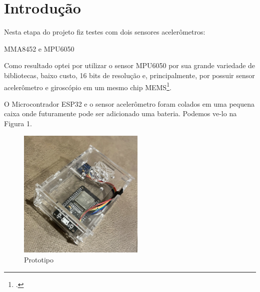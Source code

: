 \section{Introdução}


Nesta etapa do projeto fiz testes com dois sensores acelerômetros:

MMA8452 e MPU6050

Como resultado optei por utilizar o sensor MPU6050 por sua grande variedade de bibliotecas,
baixo custo, 16 bits de resolução e, principalmente, por possuir sensor acelerômetro e giroscópio em um mesmo chip MEMS\footcite{MEMS: Micro Eletro Mechanical System.}.

O Microcontrador ESP32 e o sensor acelerômetro foram colados em uma pequena caixa onde futuramente pode ser adicionado uma bateria. Podemos ve-lo na Figura 1.


\begin{figure}[H]
    \center
    \includegraphics[width=6cm]{images/Prototipo}
    \caption{Prototipo}
\end{figure}
